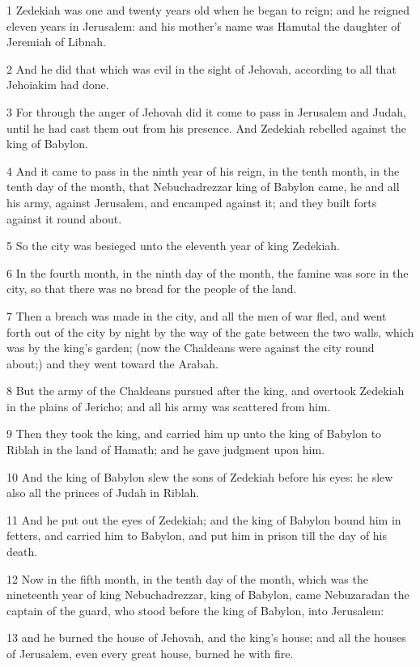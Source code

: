 \par 1 Zedekiah was one and twenty years old when he began to reign; and he reigned eleven years in Jerusalem: and his mother's name was Hamutal the daughter of Jeremiah of Libnah.
\par 2 And he did that which was evil in the sight of Jehovah, according to all that Jehoiakim had done.
\par 3 For through the anger of Jehovah did it come to pass in Jerusalem and Judah, until he had cast them out from his presence. And Zedekiah rebelled against the king of Babylon.
\par 4 And it came to pass in the ninth year of his reign, in the tenth month, in the tenth day of the month, that Nebuchadrezzar king of Babylon came, he and all his army, against Jerusalem, and encamped against it; and they built forts against it round about.
\par 5 So the city was besieged unto the eleventh year of king Zedekiah.
\par 6 In the fourth month, in the ninth day of the month, the famine was sore in the city, so that there was no bread for the people of the land.
\par 7 Then a breach was made in the city, and all the men of war fled, and went forth out of the city by night by the way of the gate between the two walls, which was by the king's garden; (now the Chaldeans were against the city round about;) and they went toward the Arabah.
\par 8 But the army of the Chaldeans pursued after the king, and overtook Zedekiah in the plains of Jericho; and all his army was scattered from him.
\par 9 Then they took the king, and carried him up unto the king of Babylon to Riblah in the land of Hamath; and he gave judgment upon him.
\par 10 And the king of Babylon slew the sons of Zedekiah before his eyes: he slew also all the princes of Judah in Riblah.
\par 11 And he put out the eyes of Zedekiah; and the king of Babylon bound him in fetters, and carried him to Babylon, and put him in prison till the day of his death.
\par 12 Now in the fifth month, in the tenth day of the month, which was the nineteenth year of king Nebuchadrezzar, king of Babylon, came Nebuzaradan the captain of the guard, who stood before the king of Babylon, into Jerusalem:
\par 13 and he burned the house of Jehovah, and the king's house; and all the houses of Jerusalem, even every great house, burned he with fire.
